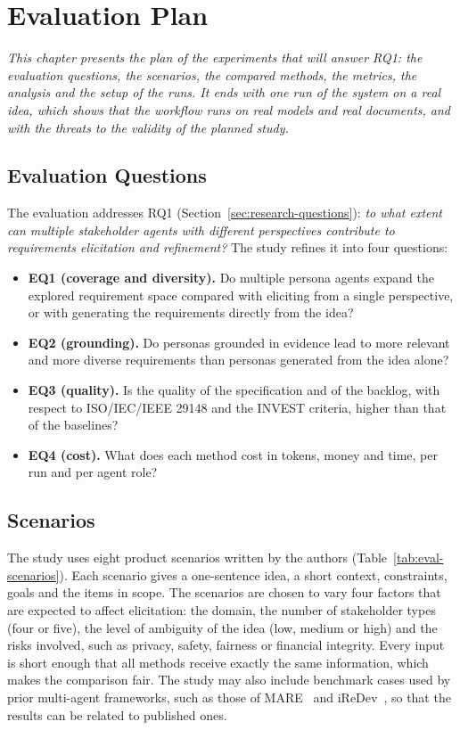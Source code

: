 \chapter{Evaluation Plan}
\label{chap:evaluation}
\textit{This chapter presents the plan of the experiments that will answer RQ1: the evaluation questions, the scenarios, the compared methods, the metrics, the analysis and the setup of the runs. It ends with one run of the system on a real idea, which shows that the workflow runs on real models and real documents, and with the threats to the validity of the planned study.}

\section{Evaluation Questions}
\label{sec:eval-rq}

The evaluation addresses RQ1 (Section~\ref{sec:research-questions}): \emph{to what extent can multiple stakeholder agents with different perspectives contribute to requirements elicitation and refinement?} The study refines it into four questions:
\begin{itemize}
    \item \textbf{EQ1 (coverage and diversity).} Do multiple persona agents expand the explored requirement space compared with eliciting from a single perspective, or with generating the requirements directly from the idea?
    \item \textbf{EQ2 (grounding).} Do personas grounded in evidence lead to more relevant and more diverse requirements than personas generated from the idea alone?
    \item \textbf{EQ3 (quality).} Is the quality of the specification and of the backlog, with respect to ISO/IEC/IEEE 29148 and the INVEST criteria, higher than that of the baselines?
    \item \textbf{EQ4 (cost).} What does each method cost in tokens, money and time, per run and per agent role?
\end{itemize}

\section{Scenarios}
\label{sec:eval-datasets}

The study uses eight product scenarios written by the authors (Table~\ref{tab:eval-scenarios}). Each scenario gives a one-sentence idea, a short context, constraints, goals and the items in scope. The scenarios are chosen to vary four factors that are expected to affect elicitation: the domain, the number of stakeholder types (four or five), the level of ambiguity of the idea (low, medium or high) and the risks involved, such as privacy, safety, fairness or financial integrity. Every input is short enough that all methods receive exactly the same information, which makes the comparison fair. The study may also include benchmark cases used by prior multi-agent frameworks, such as those of MARE~\cite{mare2024} and iReDev~\cite{jin2025iredev}, so that the results can be related to published ones.

